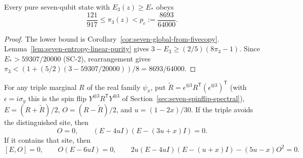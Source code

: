 \begin{proposition}
\label{prop:seven-competitor-band}
Every pure seven-qubit state with $E_3(z)\ge E_*$ obeys
\begin{equation}\label{eq:seven-competitor-band}
 \frac{121}{917}\le\pi_3(z)<p_c:=\frac{8693}{64000}.
\end{equation}
\end{proposition}
\begin{proof}
The lower bound is Corollary~\ref{cor:seven-global-from-fivecopy}.
Lemma~\ref{lem:seven-entropy-linear-purity} gives
$3-E_3\ge(2/5)(8\pi_3-1)$. Since
$E_*>59307/20000$ (SC-2), rearrangement gives
$\pi_3<(1+(5/2)(3-59307/20000))/8=8693/64000$.
\end{proof}

\begin{lemma}
\label{lem:seven-joint-spinflip}
For any triple marginal $R$ of the real family $\psi_x$, put
$\widetilde R=\epsilon^{\otimes3}R^{\mathsf T}
(\epsilon^{\otimes3})^{\mathsf T}$ (with $\epsilon=i\sigma_y$ this is the spin flip
$Y^{\otimes3}R^{\mathsf T}Y^{\otimes3}$ of Section~\ref{sec:seven-spinflip-spectral}),
$E=(R+\widetilde R)/2$, $O=(R-\widetilde R)/2$, and $u=(1-2x)/30$.
If the triple avoids the distinguished site, then
\[
 O=0,\qquad (E-4uI)(E-(3u+x)I)=0.
\]
If it contains that site, then
\begin{equation}\label{eq:seven-joint-spinflip}
 [E,O]=0,\qquad O(E-6uI)=0,\qquad
 2u(E-4uI)(E-(u+x)I)-(5u-x)O^2=0.
\end{equation}
\end{lemma}
